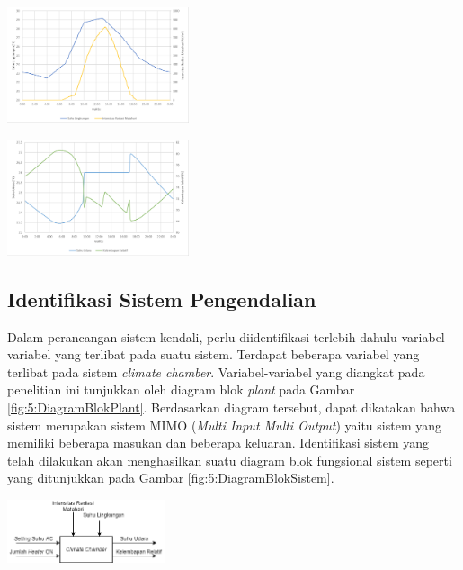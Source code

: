\documentclass[a4paper,10pt]{article}
\makeatletter
\newenvironment{body}{\begin{multicols}{2}}{\end{multicols}}
\renewenvironment{figure}
{\def\@captype{figure}%
	\captionsetup{labelsep=period,format=hang,font=footnotesize,justification=justified}
}
{}
\makeatother
\begin{document}
\begin{body}
		\begin{figure}
			\centering
			\includegraphics[width=0.4\textwidth]{figures/LoadSimulasiIESVE}
			\caption{Variabel Gangguan Simulasi ISE-VE}
			\label{fig:4:LoadSimulasiIESVE}
		\end{figure}
		
		\begin{figure}
			\centering
			\includegraphics[width=0.4\textwidth]{figures/HasilSimulasiIESVE}
			\caption{Data Hasil Simulasi ISE-VE}
			\label{fig:4:HasilSimulasiIESVE}
		\end{figure}
		\vspace{2mm}
		
		\subsection{Identifikasi Sistem Pengendalian}
		
		Dalam perancangan sistem kendali, perlu diidentifikasi terlebih dahulu variabel-variabel yang terlibat pada suatu sistem. Terdapat beberapa variabel yang terlibat pada sistem \textit{climate chamber}. Variabel-variabel yang diangkat pada penelitian ini tunjukkan oleh diagram blok \textit{plant} pada Gambar \ref{fig:5:DiagramBlokPlant}. Berdasarkan diagram tersebut, dapat dikatakan bahwa sistem merupakan sistem MIMO (\textit{Multi Input Multi Output}) yaitu sistem yang memiliki beberapa masukan dan beberapa keluaran. Identifikasi sistem yang telah dilakukan akan menghasilkan suatu diagram blok fungsional sistem seperti yang ditunjukkan pada Gambar \ref{fig:5:DiagramBlokSistem}.\\
		
		\begin{figure}
			\centering
			\includegraphics[width=0.35\textwidth]{figures/BlokDiagramPlant}
			\caption{Diagram Blok \textit{Plant}}
			\label{fig:5:DiagramBlokPlant}
		\end{figure}
		\vspace{1em}
		

\end{body}
\end{document}
